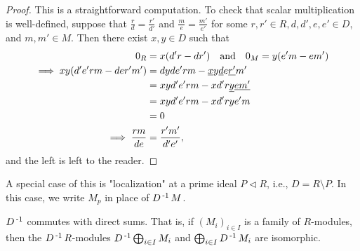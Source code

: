 \documentclass[11pt]{book}
\theoremstyle{definition}   \newtheorem{defn}[counter]{Definition} %
\newcommand{\bs}{\setminus}   \newcommand{\A}{\mathcal{A}}   \newcommand{\sy}{\textnormal{Syl}}   \newcommand{\size}[1]{\left| #1 \right|}
\newcommand{\vs}{\vspace{8pt}}
\numberwithin{counter}{chapter}
\begin{document}
\begin{proof}
This is a straightforward computation. To check that scalar multiplication is well-defined, suppose that $\frac{r}{d} = \frac{r'}{d'}$ and $\frac{m}{e} = \frac{m'}{e'}$ for some $r,r' \in R, d,d',e,e' \in D$, and $m,m' \in M$. Then there exist $x,y \in D$ such that
\begin{align*}
0_R &= x(d'r-dr') \quad \textnormal{and} \quad 0_M = y(e'm-em') \\
\implies xy(d'e'rm - der'm') &= dyde'rm - \underline{x} y \underline{d} e \underline{r'} m' \\
&= xyd'e'rm - xd'r\underline{y} \underline{e} \underline{m'} \\
&= xyd'e'rm - xd'rye'm \\
&= 0 \\
\implies \frac{rm}{de} &= \frac{r'm'}{d'e'},
\end{align*}
and the left is left to the reader. 
\end{proof}

\vs

A special case of this is "localization" at a prime ideal $P \vartriangleleft R$, i.e., $D = R \bs P$. In this case, we write $M_p$ in place of $D\operatorname{^{-1}} M$. 

\vs

\begin{lemma}
$D\operatorname{^{-1}}$ commutes with direct sums. That is, if $(M_i)_{i \in I}$ is a family of $R$-modules, then the $D\operatorname{^{-1}} R$-modules $D\operatorname{^{-1}} \bigoplus_{i \in I} M_i$ and $\bigoplus_{i \in I} D\operatorname{^{-1}} M_i$ are isomorphic. 
\end{lemma}
\end{document}
